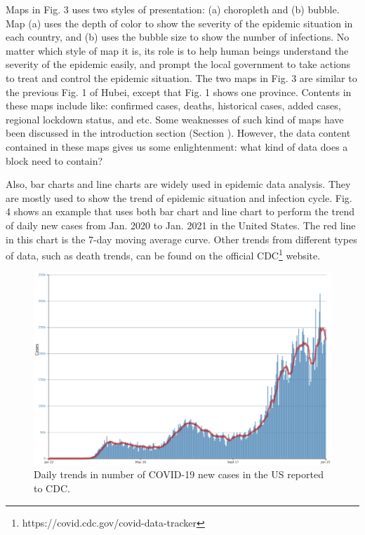 \documentclass[conference]{IEEEtran}
\begin{document}
Maps in Fig. 3 uses two styles of presentation: (a) choropleth and (b) bubble.
Map (a) uses the depth of color to show the severity of the epidemic situation in each country, and (b) uses the bubble size to show the number of infections.
No matter which style of map it is, its role is to help human beings understand the severity of the epidemic easily, and prompt the local government to take actions to treat and control the epidemic situation.
The two maps in Fig. 3 are similar to the previous Fig. 1 of Hubei, except that Fig. 1 shows one province.
Contents in these maps include like: confirmed cases, deaths, historical cases, added cases, regional lockdown status, and etc.
Some weaknesses of such kind of maps have been discussed in the introduction section (Section \uppercase\expandafter{}).
However, the data content contained in these maps gives us some enlightenment: what kind of data does a block need to contain?

Also, bar charts and line charts are widely used in epidemic data analysis.
They are mostly used to show the trend of epidemic situation and infection cycle.
Fig. 4 shows an example that uses both bar chart and line chart to perform the trend of daily new cases from Jan. 2020 to Jan. 2021 in the United States.
The red line in this chart is the 7-day moving average curve.
Other trends from different types of data, such as death trends, can be found on the official CDC\footnote{https://covid.cdc.gov/covid-data-tracker} website.
\begin{figure}[h]
    \centering\includegraphics[width=\linewidth]{linebar-us-1-15.png}
    \caption{Daily trends in number of COVID-19 new cases in the US reported to CDC.}
\end{figure}
\end{document}
